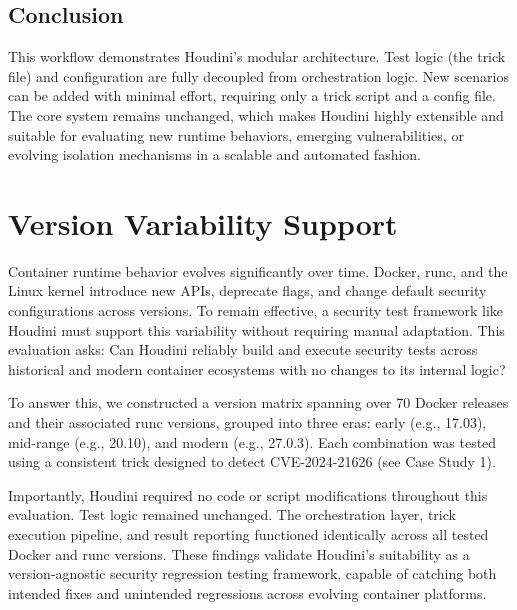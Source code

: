 \documentclass[12pt]{report}
\begin{document}
\begin{doublespace}
\subsection*{Conclusion}

This workflow demonstrates Houdini’s modular architecture. Test logic (the trick file) and configuration are fully decoupled from orchestration logic. New scenarios can be added with minimal effort, requiring only a trick script and a config file. The core system remains unchanged, which makes Houdini highly extensible and suitable for evaluating new runtime behaviors, emerging vulnerabilities, or evolving isolation mechanisms in a scalable and automated fashion.


















\section{Version Variability Support}

Container runtime behavior evolves significantly over time. Docker, runc, and the Linux kernel introduce new APIs, deprecate flags, and change default security configurations across versions. To remain effective, a security test framework like Houdini must support this variability without requiring manual adaptation. This evaluation asks: Can Houdini reliably build and execute security tests across historical and modern container ecosystems with no changes to its internal logic?

To answer this, we constructed a version matrix spanning over 70 Docker releases and their associated runc versions, grouped into three eras: early (e.g., 17.03), mid-range (e.g., 20.10), and modern (e.g., 27.0.3). Each combination was tested using a consistent trick designed to detect CVE-2024-21626 (see Case Study 1).

Importantly, Houdini required no code or script modifications throughout this evaluation. Test logic remained unchanged. The orchestration layer, trick execution pipeline, and result reporting functioned identically across all tested Docker and runc versions. These findings validate Houdini’s suitability as a version-agnostic security regression testing framework, capable of catching both intended fixes and unintended regressions across evolving container platforms.


\end{doublespace}
\end{document}

